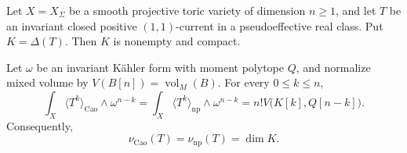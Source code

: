 \par\noindent\begin{minipage}{\linewidth}
\begin{theorem}\label{thm:ok-toric-real-products}
Let $X=X_\Sigma$ be a smooth projective toric variety of dimension
$n\geq1$, and let $T$ be an invariant closed positive
$(1,1)$-current in a pseudoeffective real class.  Put
$K=\Delta(T)$.  Then $K$ is nonempty and compact.

Let $\omega$ be an invariant K\"ahler form with moment polytope $Q$,
and normalize mixed volume by
$V(B[n])=\operatorname{vol}_M(B)$.  For every $0\leq k\leq n$,
\[
 \int_X\langle T^k\rangle_{\mathrm{Cao}}\wedge\omega^{n-k}
 =\int_X\langle T^k\rangle_{\mathrm{np}}\wedge\omega^{n-k}
 =n!V\bigl(K[k],Q[n-k]\bigr).
\tag{55.51}\label{eq:ok-toric-real-products}
\]
Consequently,
\[
                    \nu_{\mathrm{Cao}}(T)
                    =\nu_{\mathrm{np}}(T)
                    =\dim K.
\tag{55.52}\label{eq:ok-toric-real-dimension}
\]
\end{theorem}
\end{minipage}\par


